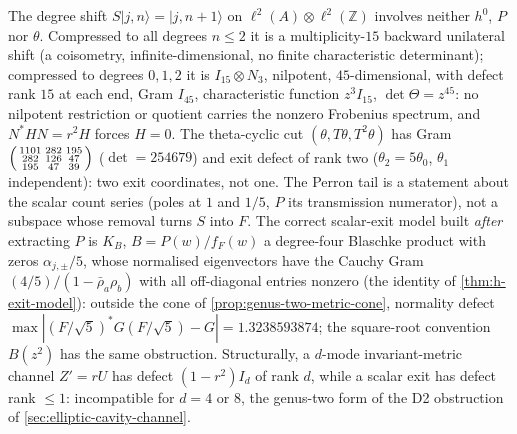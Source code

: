 \begin{theorem}
\label{thm:degree-cut-not-h1}
The degree shift $S|j,n\rangle = |j,n+1\rangle$ on $\ell^2(A)\otimes\ell^2(\mathbb Z)$ involves neither $h^0$, $P$ nor $\theta$. Compressed to
all degrees $n\le2$ it is a multiplicity-$15$ backward unilateral shift (a coisometry, infinite-dimensional, no finite
characteristic determinant); compressed to degrees $0,1,2$ it is $I_{15}\otimes N_3$, nilpotent, $45$-dimensional, with
defect rank $15$ at each end, Gram $I_{45}$, characteristic function $z^3I_{15}$, $\det\Theta = z^{45}$: no nilpotent
restriction or quotient carries the nonzero Frobenius spectrum, and $N^{*}HN = r^2H$ forces $H = 0$. The theta-cyclic cut
$(\theta,T\theta,T^2\theta)$ has Gram $\begin{psmallmatrix}1101&282&195\\282&126&47\\195&47&39\end{psmallmatrix}$ ($\det = 254679$) and exit
defect of rank two ($\theta_2 = 5\theta_0$, $\theta_1$ independent): two exit coordinates, not one. The Perron tail is a
statement about the scalar count series (poles at $1$ and $1/5$, $P$ its transmission numerator), not a subspace whose
removal turns $S$ into $F$. The correct scalar-exit model built \emph{after} extracting $P$ is $K_B$, $B = P(w)/f_F(w)$ a
degree-four Blaschke product with zeros $\alpha_{j,\pm}/5$, whose normalised eigenvectors have the Cauchy Gram
$(4/5)/(1-\bar\rho_a\rho_b)$ with all off-diagonal entries nonzero (the identity of \cref{thm:h-exit-model}): outside the cone of
\cref{prop:genus-two-metric-cone}, normality defect $\max|(F/\sqrt5)^{*}G(F/\sqrt5)-G| = 1.3238593874$; the square-root
convention $B(z^2)$ has the same obstruction. Structurally, a $d$-mode invariant-metric channel $Z' = rU$ has defect
$(1-r^2)I_d$ of rank $d$, while a scalar exit has defect rank $\le1$: incompatible for $d = 4$ or $8$, the genus-two form of
the D2 obstruction of \cref{sec:elliptic-cavity-channel}.
\end{theorem}

